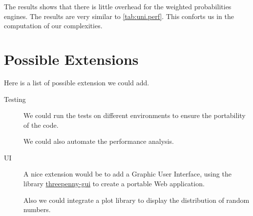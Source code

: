 \documentclass[12pt,a4paper,titlepage]{article}
\begin{document}
The results shows that there is little overhead for the weighted probabilities
engines. The results are very similar to \autoref{tab:uni.perf}.
This conforts us in the computation of our complexities.

\newpage
\section{Possible Extensions}
\label{sec:ext}
Here is a list of possible extension we could add.
\begin{description}
	\item [Testing]
	We could run the tests on different environments to ensure the portability of 
	the code.
	
	We could also automate the performance analysis.
	\item [UI] 
	A nice extension would be to add a Graphic User Interface,
	using the library 
	\href{https://hackage.haskell.org/package/threepenny-gui}{threepenny-gui}
	to create a portable Web application. 

	Also we could integrate a plot library to display the distribution of 
	random numbers.
\end{description}


\newpage
\appendix
\end{document}
